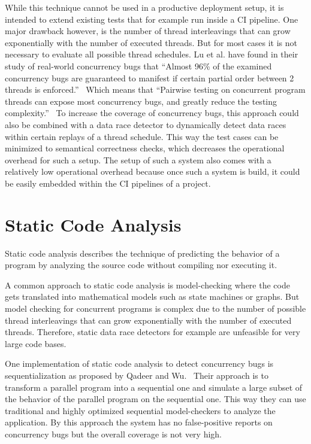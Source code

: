 \documentclass[conference]{IEEEtran}
\begin{document}
While this technique cannot be used in a productive deployment setup, it is intended to extend existing tests that for example run inside a CI pipeline.
One major drawback however, is the number of thread interleavings that can grow exponentially with the number of executed threads.
But for most cases it is not necessary to evaluate all possible thread schedules.
Lu et al. have found in their study of real-world concurrency bugs that ``Almost 96\% of the examined concurrency bugs are guaranteed to manifest if certain partial order between 2 threads is enforced.''~\cite{lu2008mistakes}
Which means that ``Pairwise testing on concurrent program threads can expose most concurrency bugs, and greatly reduce the testing complexity.''~\cite{lu2008mistakes}
To increase the coverage of concurrency bugs, this approach could also be combined with a data race detector to dynamically detect data races within certain replays of a thread schedule.
This way the test cases can be minimized to semantical correctness checks, which decreases the operational overhead for such a setup.
The setup of such a system also comes with a relatively low operational overhead because once such a system is build, it could be easily embedded within the CI pipelines of a project.


\section{Static Code Analysis}
\label{sct:static}

Static code analysis describes the technique of predicting the behavior of a program by analyzing the source code without compiling nor executing it.

A common approach to static code analysis is model-checking where the code gets translated into mathematical models such as state machines or graphs.
But model checking for concurrent programs is complex due to the number of possible thread interleavings that can grow exponentially with the number of executed threads.
Therefore, static data race detectors for example are unfeasible for very large code bases.~\cite{serebry2009threadsanitizer}

One implementation of static code analysis to detect concurrency bugs is sequentialization as proposed by Qadeer and Wu.~\cite{qadeer2004kiss}
Their approach is to transform a parallel program into a sequential one and simulate a large subset of the behavior of the parallel program on the sequential one.
This way they can use traditional and highly optimized sequential model-checkers to analyze the application.
By this approach the system has no false-positive reports on concurrency bugs but the overall coverage is not very high.
\end{document}
